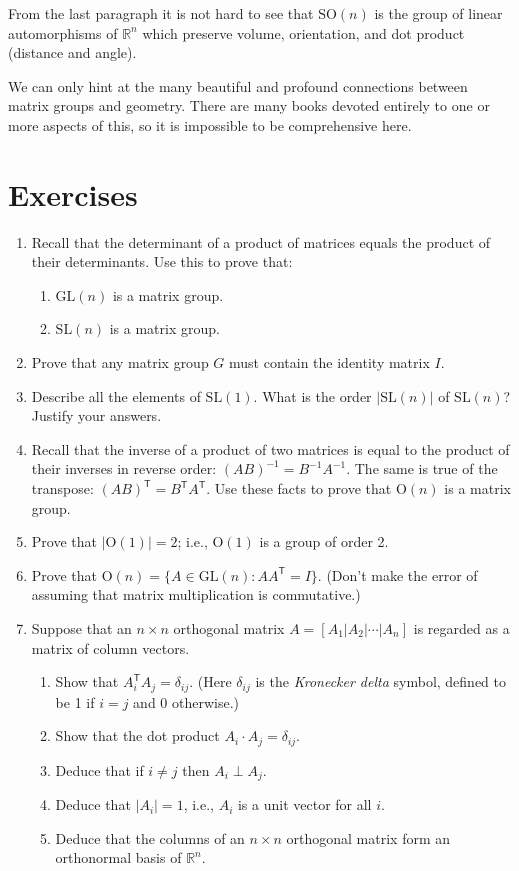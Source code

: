 \documentclass[11pt]{article}
\newenvironment{problems}
{
 \begin{enumerate}[topsep=1pt,itemsep=0pt,parsep=2pt,%
 label={\arabic*.}, ref=\arabic*] \small
}
{
 \end{enumerate}
}
\theoremstyle{definition}
\newcommand{\R}{\mathbb{R}} %
\newcommand{\GL}{\mathrm{GL}}
\newcommand{\SL}{\mathrm{SL}}
\newcommand{\Orth}{\mathrm{O}}
\newcommand{\SO}{\mathrm{SO}}
\newcommand{\transpose}{\mathsf{T}}
\begin{document}
From the last paragraph it is not hard to see that $\SO(n)$ is the
group of linear automorphisms of $\R^n$ which preserve volume,
orientation, and dot product (distance and angle).

We can only hint at the many beautiful and profound connections
between matrix groups and geometry. There are many books devoted
entirely to one or more aspects of this, so it is impossible to be
comprehensive here.


\section*{Exercises}
\begin{problems}
\item Recall that the determinant of a product of matrices equals the
  product of their determinants. Use this to prove that:
  \begin{enumerate}
  \item $\GL(n)$ is a matrix group.
  \item $\SL(n)$ is a matrix group. 
  \end{enumerate}

\item Prove that any matrix group $G$ must contain the identity matrix
  $I$.

\item Describe all the elements of $\SL(1)$. What is the order
  $|\SL(n)|$ of $\SL(n)$? Justify your answers.

\item Recall that the inverse of a product of two matrices is equal to
  the product of their inverses in reverse order: $(AB)^{-1} = B^{-1}
  A^{-1}$. The same is true of the transpose: $(AB)^\transpose =
  B^\transpose A^\transpose$. Use these facts to prove that $\Orth(n)$
  is a matrix group.

\item Prove that $|\Orth(1)| = 2$; i.e., $\Orth(1)$ is a group of order 2. 

\item Prove that $\Orth(n) = \{ A \in \GL(n) : AA^\transpose = I
  \}$. (Don't make the error of assuming that matrix multiplication is
  commutative.)

\item Suppose that an $n \times n$ orthogonal matrix $A = [A_1 | A_2 |
  \cdots |A_n]$ is regarded as a matrix of column vectors. 
  \begin{enumerate}
  \item Show that $A_i^\transpose A_j = \delta_{ij}$. (Here
    $\delta_{ij}$ is the \emph{Kronecker delta} symbol, defined to be
    1 if $i=j$ and $0$ otherwise.)
  \item Show that the dot product $A_i \cdot A_j = \delta_{ij}$.
  \item Deduce that if $i \ne j$ then $A_i \perp A_j$.
  \item Deduce that $|A_i| = 1$, i.e., $A_i$ is a unit vector for all
    $i$.
  \item Deduce that the columns of an $n \times n$ orthogonal matrix
    form an orthonormal basis of $\R^n$.
  \end{enumerate}
  


\end{problems}
\end{document}
